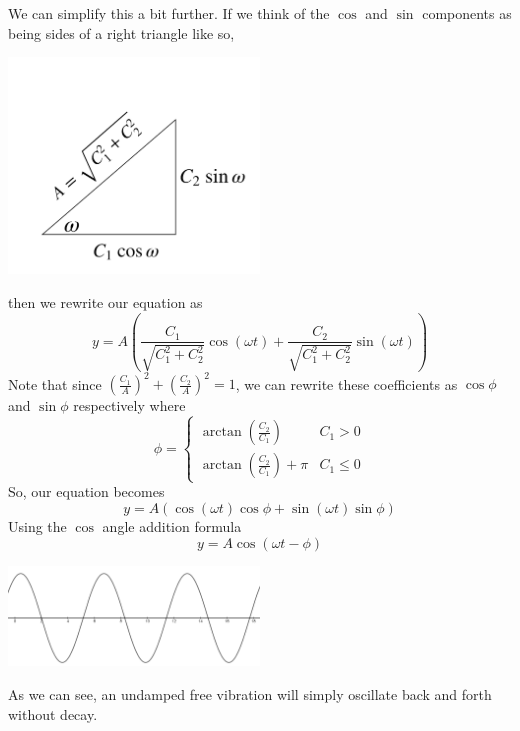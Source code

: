 \noindent
We can simplify this a bit further. If we think of the $\cos$ and $\sin$ components as being sides of a right triangle like so,
\begin{center}
	\includegraphics[width=0.5\textwidth]{./higherOrder/freeVibrs/triangle.png}
\end{center}
then we rewrite our equation as
\begin{equation*}
	y = A\left( \frac{C_1}{\sqrt{C_1^2 + C_2^2}}\cos{(\omega t)} + \frac{C_2}{\sqrt{C_1^2 + C_2^2}}\sin{(\omega t)} \right)
\end{equation*}
Note that since $\left(\frac{C_1}{A}\right)^2 + \left(\frac{C_2}{A}\right)^2 = 1$, we can rewrite these coefficients as $\cos{\phi}$ and $\sin{\phi}$ respectively where
\begin{equation*}
	\phi = \begin{cases}
		\arctan{(\frac{C_2}{C_1})} & C_1 > 0 \\
		\arctan{(\frac{C_2}{C_1})} + \pi & C_1 \leq 0
	\end{cases}
\end{equation*} 
So, our equation becomes
\begin{equation*}
	y = A\left(\cos{(\omega t)}\cos{\phi} + \sin{(\omega t)}\sin{\phi}\right)
\end{equation*}
Using the $\cos$ angle addition formula
\begin{equation*}
	y = A\cos{(\omega t - \phi)}
\end{equation*}
\begin{center}
	\includegraphics[width=0.5\textwidth]{./higherOrder/freeVibrs/undampedfree.png}
\end{center}
As we can see, an undamped free vibration will simply oscillate back and forth without decay.

\ifodd{}\fi